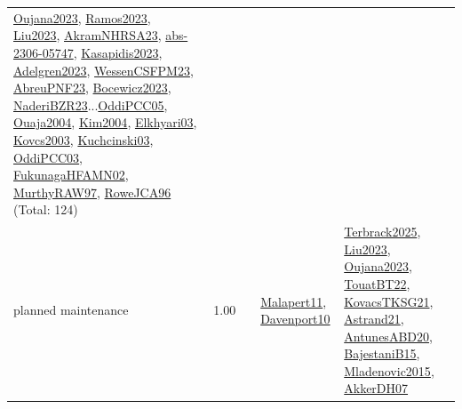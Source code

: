 {\begin{longtable}{p{3cm}r>{\raggedright\arraybackslash}p{6cm}>{\raggedright\arraybackslash}p{6cm}>{\raggedright\arraybackslash}p{8cm}}
\hyperref[detail:Oujana2023]{Oujana2023}, \hyperref[detail:Ramos2023]{Ramos2023}, \hyperref[detail:Liu2023]{Liu2023}, \hyperref[detail:AkramNHRSA23]{AkramNHRSA23}, \hyperref[detail:abs-2306-05747]{abs-2306-05747}, \hyperref[detail:Kasapidis2023]{Kasapidis2023}, \hyperref[detail:Adelgren2023]{Adelgren2023}, \hyperref[detail:WessenCSFPM23]{WessenCSFPM23}, \hyperref[detail:AbreuPNF23]{AbreuPNF23}, \hyperref[detail:Bocewicz2023]{Bocewicz2023}, \hyperref[detail:NaderiBZR23]{NaderiBZR23}...\hyperref[detail:OddiPCC05]{OddiPCC05}, \hyperref[detail:Ouaja2004]{Ouaja2004}, \hyperref[detail:Kim2004]{Kim2004}, \hyperref[detail:Elkhyari03]{Elkhyari03}, \hyperref[detail:Kovcs2003]{Kovcs2003}, \hyperref[detail:Kuchcinski03]{Kuchcinski03}, \hyperref[detail:OddiPCC03]{OddiPCC03}, \hyperref[detail:FukunagaHFAMN02]{FukunagaHFAMN02}, \hyperref[detail:MurthyRAW97]{MurthyRAW97}, \hyperref[detail:RoweJCA96]{RoweJCA96} (Total: 124)\\
\index{planned maintenance}\index{Concepts!planned maintenance}planned maintenance &  1.00 &  & \hyperref[detail:Malapert11]{Malapert11}, \hyperref[detail:Davenport10]{Davenport10} & \hyperref[detail:Terbrack2025]{Terbrack2025}, \hyperref[detail:Liu2023]{Liu2023}, \hyperref[detail:Oujana2023]{Oujana2023}, \hyperref[detail:TouatBT22]{TouatBT22}, \hyperref[detail:KovacsTKSG21]{KovacsTKSG21}, \hyperref[detail:Astrand21]{Astrand21}, \hyperref[detail:AntunesABD20]{AntunesABD20}, \hyperref[detail:BajestaniB15]{BajestaniB15}, \hyperref[detail:Mladenovic2015]{Mladenovic2015}, \hyperref[detail:AkkerDH07]{AkkerDH07}\\

\end{longtable}}
